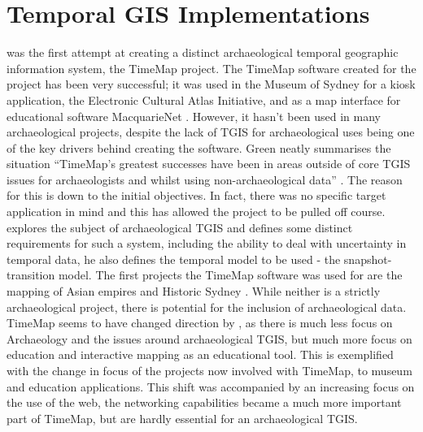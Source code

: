 \section{Temporal GIS Implementations}
\citet{Johnson:1999cr} was the first attempt at creating a distinct archaeological temporal geographic information system, the TimeMap project. The TimeMap software created for the project has been very successful; it was used in the Museum of Sydney for a kiosk application, the Electronic Cultural Atlas Initiative, and as a map interface for educational software MacquarieNet \citep{Johnson:2002kx}. However, it hasn't been used in many archaeological projects, despite the lack of TGIS for archaeological uses being one of the key drivers behind creating the software. Green neatly summarises the situation ``TimeMap's greatest successes have been in areas outside of core TGIS issues for archaeologists and whilst using non-archaeological data'' \citep[101]{Green:2008fk}. The reason for this is down to the initial objectives. In fact, there was no specific target application in mind \citep{Johnson:1999cr} and this has allowed the project to be pulled off course. \citet{Johnson:1999cr} explores the subject of archaeological TGIS and defines some distinct requirements for such a system, including the ability to deal with uncertainty in temporal data, he also defines the temporal model to be used - the snapshot-transition model. The first projects the TimeMap software was used for are the mapping of Asian empires and Historic Sydney \citep{Johnson:1999cr}. While neither is a strictly archaeological project, there is potential for the inclusion of archaeological data. TimeMap seems to have changed direction by \citet{Johnson:2002kx}, as there is much less focus on Archaeology and the issues around archaeological TGIS, but much more focus on education and interactive mapping as an educational tool. This is exemplified with the change in focus of the projects now involved with TimeMap, to museum and education applications. This shift was accompanied by an increasing focus on the use of the web, the networking capabilities became a much more important part of TimeMap, but are hardly essential for an archaeological TGIS. 


